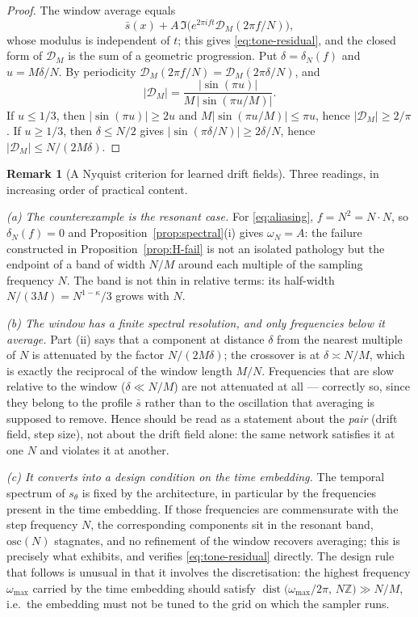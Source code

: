 \documentclass[a4paper,fleqn]{cas-dc}
\theoremstyle{definition}
\newtheorem{remark}[theorem]{Remark}
\begin{document}
\begin{proof}
The window average equals
\[
\bar s(x)+A\,\Im\bigl(e^{2\pi ift}\mathcal{D}_{M}(2\pi f/N)\bigr),
\]
whose modulus is independent of $t$; this gives \eqref{eq:tone-residual}, and the
closed form of
$\mathcal{D}_{M}$ is the sum of a geometric progression. Put $\delta=\delta_{N}(f)$ and
$u=M\delta/N$. By periodicity $\mathcal{D}_{M}(2\pi f/N)=\mathcal{D}_{M}(2\pi\delta/N)$, and
\[
\lvert\mathcal{D}_{M}\rvert=\frac{\lvert\sin(\pi u)\rvert}{M\,\lvert\sin(\pi u/M)\rvert}.
\]
If $u\le1/3$, then $\lvert\sin(\pi u)\rvert\ge2u$ and
$M\lvert\sin(\pi u/M)\rvert\le\pi u$, hence $\lvert\mathcal{D}_{M}\rvert\ge2/\pi$.
If $u\ge1/3$, then $\delta\le N/2$ gives $\lvert\sin(\pi\delta/N)\rvert\ge2\delta/N$,
hence $\lvert\mathcal{D}_{M}\rvert\le N/(2M\delta)$.
\end{proof}

\begin{remark}[A Nyquist criterion for learned drift fields]
\label{rem:spectral}
Three readings, in increasing order of practical content.

\emph{(a) The counterexample is the resonant case.} For
\eqref{eq:aliasing}, $f=N^{2}=N\cdot N$, so $\delta_{N}(f)=0$ and
Proposition~\ref{prop:spectral}(i) gives $\omega_{N}=A$: the failure constructed in
Proposition~\ref{prop:H-fail} is not an isolated pathology but the endpoint of a band of width
$N/M$ around each multiple of the sampling frequency $N$. The band is not thin in
relative terms: its half-width $N/(3M)=N^{1-\kappa}/3$ grows with $N$.

\emph{(b) The window has a finite spectral resolution, and only frequencies below it
average.} Part (ii) says that a component at distance $\delta$ from the nearest multiple
of $N$ is attenuated by the factor $N/(2M\delta)$; the crossover is at
$\delta\asymp N/M$, which is exactly the reciprocal of the window length $M/N$. Frequencies
that are slow relative to the window ($\delta\ll N/M$) are not attenuated at all ---
correctly so, since they belong to the profile $\bar s$ rather than to the oscillation
that averaging is supposed to remove. Hence  should be read as a statement
about the \emph{pair} (drift field, step size), not about the drift field alone: the
same network satisfies it at one $N$ and violates it at another.

\emph{(c) It converts into a design condition on the time embedding.} The temporal
spectrum of $s_{\theta}$ is fixed by the architecture, in particular by the frequencies
present in the time embedding. If those frequencies are commensurate with the step
frequency $N$, the corresponding components sit in the resonant band, $\mathrm{osc}(N)$
stagnates, and no refinement of the window recovers averaging; this is precisely what
 exhibits, and  verifies
\eqref{eq:tone-residual} directly. The design rule that follows is unusual in that it
involves the discretisation: the highest frequency $\omega_{\max}$ carried by the time
embedding should satisfy
$\operatorname{dist}\bigl(\omega_{\max}/2\pi,\,N\mathbb{Z}\bigr)\gg N/M$, i.e.\ the
embedding must not be tuned to the grid on which the sampler runs.
\end{remark}
\end{document}
